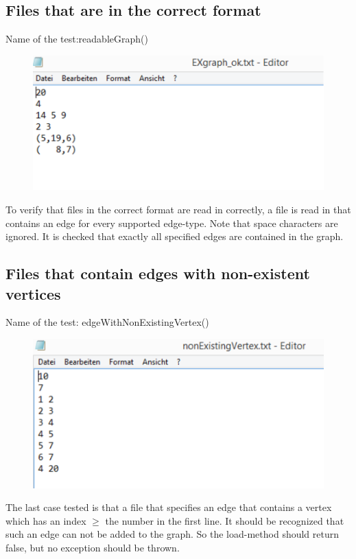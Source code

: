 \documentclass{article}
\begin{document}
\subsection{Files that are in the correct format}
Name of the test:readableGraph()
\begin{figure}[H]
	\includegraphics[width=.7\textwidth,keepaspectratio]{./img/EXGraphOk.pdf}
\end{figure}
To verify that files in the correct format are read in correctly, a file is read in that contains an edge for every supported edge-type. Note that space characters are ignored. It is checked that exactly all specified edges are contained in the graph.
\subsection{Files that contain edges with non-existent vertices}
Name of the test: edgeWithNonExistingVertex()
\begin{figure}[H]
	\includegraphics[width=.7\textwidth,keepaspectratio]{./img/nonExistingVertex.pdf}
\end{figure}
The last case tested is that a file that specifies an edge that contains a vertex which has an index $\geq$ the number in the first line. It should be recognized that such an edge can not be added to the graph. So the load-method should return false, but no exception should be thrown.
\end{document}
